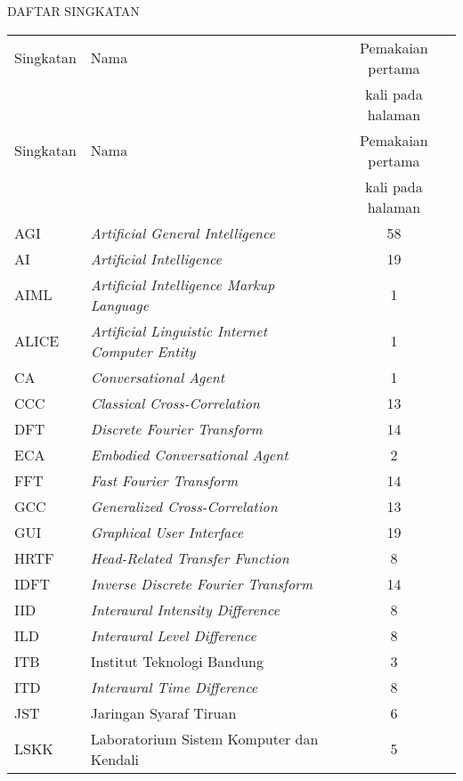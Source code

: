 \begin{center}
\large{DAFTAR SINGKATAN}

\vskip 1cm


\normalsize
\begin{longtable}{p{2.25cm} p{7.75cm} c }

\centering Singkatan & \centering Nama & Pemakaian pertama \\
 & & kali pada halaman \\[.5em]
\endfirsthead

\centering Singkatan & \centering Nama & Pemakaian pertama \\
 & & kali pada halaman \\[.5em]
\endhead

AGI & \textit{Artificial General Intelligence} & 58 \\[.5em]
AI & \textit{Artificial Intelligence} & 19 \\[.5em]
AIML & \textit{Artificial Intelligence Markup Language} & 1 \\[.5em]
ALICE & \textit{Artificial Linguistic Internet Computer Entity} & 1 \\[.5em]
CA & \textit{Conversational Agent} & 1 \\[.5em]
CCC & \textit{Classical Cross-Correlation} & 13 \\[.5em]
DFT & \textit{Discrete Fourier Transform} & 14 \\[.5em]
ECA & \textit{Embodied Conversational Agent} & 2 \\[.5em]
FFT & \textit{Fast Fourier Transform} & 14 \\[.5em]
GCC & \textit{Generalized Cross-Correlation} & 13 \\[.5em]
GUI & \textit{Graphical User Interface} & 19 \\[.5em]
HRTF & \textit{Head-Related Transfer Function} & 8 \\[.5em]
IDFT & \textit{Inverse Discrete Fourier Transform} & 14 \\[.5em]
IID & \textit{Interaural Intensity Difference} & 8 \\[.5em]
ILD & \textit{Interaural Level Difference} & 8 \\[.5em]
ITB & Institut Teknologi Bandung & 3 \\[.5em]
ITD & \textit{Interaural Time Difference} & 8 \\[.5em]
JST & Jaringan Syaraf Tiruan & 6 \\[.5em]
LSKK & Laboratorium Sistem Komputer dan Kendali & 5 \\[.5em]

\end{longtable}
\end{center}

